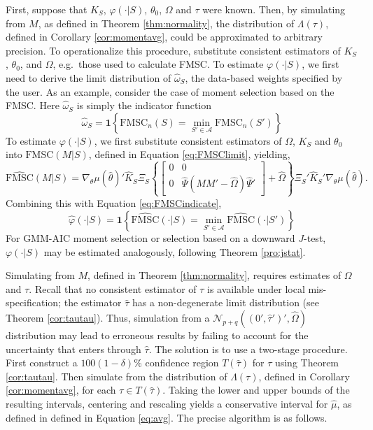 \documentclass[12pt]{article}
\theoremstyle{definition}
\begin{document}
First, suppose that $K_S$, $\varphi(\cdot|S)$, $\theta_0$, $\Omega$ and $\tau$ were known. Then, by simulating from $M$, as defined in Theorem \ref{thm:normality}, the distribution of $\Lambda(\tau)$, defined in Corollary \ref{cor:momentavg}, could be approximated to arbitrary precision. To operationalize this procedure, substitute consistent estimators of $K_S$, $\theta_0$, and $\Omega$, e.g.\ those used to calculate FMSC. To estimate $\varphi(\cdot|S)$, we first need to derive the limit distribution of $\widehat{\omega}_S$, the data-based weights specified by the user. As an example, consider the case of moment selection based on the FMSC. Here $\widehat{\omega}_S$ is simply the indicator function
\begin{equation}
	\label{eq:FMSCindicate}
	\widehat{\omega}_S = \mathbf{1}\left\{\mbox{FMSC}_n(S) = \min_{S'\in \mathcal{A}} \mbox{FMSC}_n(S')\right\}
\end{equation}
To estimate $\varphi(\cdot|S)$, we first substitute consistent estimators of $\Omega$, $K_S$ and $\theta_0$ into $\mbox{FMSC}(M|S)$, defined in Equation \ref{eq:FMSClimit}, yielding,
\begin{equation}
	\widehat{\mbox{FMSC}}(M|S) = \nabla_\theta\mu(\widehat{\theta})'\widehat{K}_S\Xi_S \left\{\left[\begin{array}{cc}0&0\\0&\widehat{\Psi} \left(MM' - \widehat{\Omega}\right)\widehat{\Psi}' \end{array}\right] + \widehat{\Omega}\right\}\Xi_S'\widehat{K}_S'\nabla_\theta\mu(\widehat{\theta}).
\end{equation}
Combining this with Equation \ref{eq:FMSCindicate},
\begin{equation}
\label{eq:omegahat}
	\widehat{\varphi}(\cdot|S) = \mathbf{1}\left\{\widehat{\mbox{FMSC}}(\cdot|S) = \min_{S'\in \mathcal{A}} \widehat{\mbox{FMSC}}(\cdot|S')\right\}
\end{equation}
For GMM-AIC moment selection or selection based on a downward $J$-test, $\varphi(\cdot|S)$ may be estimated analogously, following  Theorem \ref{pro:jstat}. 

Simulating from $M$, defined in Theorem \ref{thm:normality}, requires estimates of $\Omega$ and $\tau$. Recall that no consistent estimator of $\tau$ is available under local mis-specification; the estimator $\widehat{\tau}$ has a non-degenerate limit distribution (see Theorem \ref{cor:tautau}). Thus, simulation from a $\mathcal{N}_{p+q}((0', \widehat{\tau}')',\widehat{\Omega} )$ distribution may lead to erroneous results by failing to account for the uncertainty that enters through $\widehat{\tau}$. The solution is to use a two-stage procedure. First construct a  $100(1-\delta)\%$ confidence region $T(\widehat{\tau})$ for $\tau$ using Theorem \ref{cor:tautau}. Then simulate from the distribution of $\Lambda(\tau)$, defined in Corollary \ref{cor:momentavg}, for each $\tau \in T(\widehat{\tau})$. Taking the lower and upper bounds of the resulting intervals, centering and rescaling yields a conservative interval for $\widehat{\mu}$, as defined in defined in Equation \ref{eq:avg}. The precise algorithm is as follows.
\end{document}

